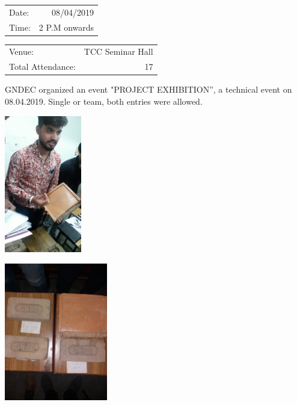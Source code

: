 \documentclass[12pt, a4 paper]{article}
\begin{document}
\begin{center}
\begin{multicols}{2}
\begin{tabular}{l r}
Date: & 08/04/2019\\ %
Time: & 2 P.M onwards \\ %
\end{tabular}

\columnbreak

\begin{tabular}{l r}
Venue: & TCC Seminar Hall \\ %
Total Attendance: & 17 \\ %
\end{tabular}
\end{multicols}

\begin{Large}
\begin{multicols}{2}
\justify
GNDEC organized an event "PROJECT EXHIBITION”, a technical event on 08.04.2019. Single or team, both entries were allowed.
\columnbreak


\includegraphics[width=\linewidth,height=6cm]{image8.jpeg}
\end{multicols}

\begin{multicols}{2}

\includegraphics[width=\linewidth,height=6cm]{image7.jpeg}


\end{multicols}
\end{Large}
\end{center}
\end{document}
